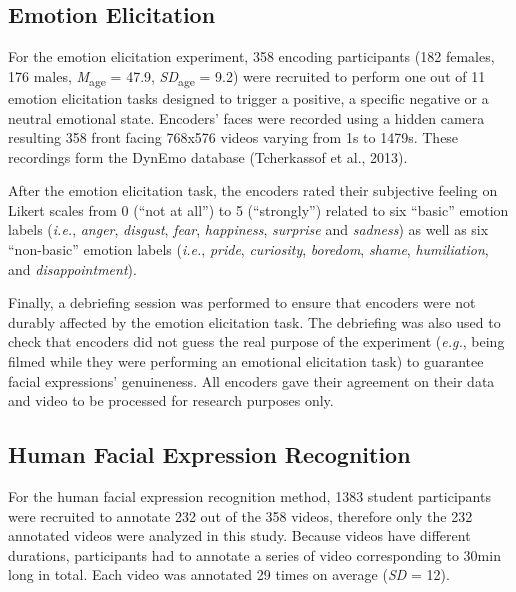 \documentclass[man]{apa6}
\begin{document}
\hypertarget{emotion-elicitation}{%
\subsection{Emotion Elicitation}\label{emotion-elicitation}}

For the emotion elicitation experiment, 358 encoding participants (182 females, 176 males, \emph{M}\textsubscript{age} = 47.9, \emph{SD}\textsubscript{age} = 9.2) were recruited to perform one out of 11 emotion elicitation tasks designed to trigger a positive, a specific negative or a neutral emotional state. Encoders' faces were recorded using a hidden camera resulting 358 front facing 768x576 videos varying from 1s to 1479s. These recordings form the DynEmo database (Tcherkassof et al., 2013).

After the emotion elicitation task, the encoders rated their subjective feeling on Likert scales from 0 (\enquote{not at all}) to 5 (\enquote{strongly}) related to six \enquote{basic} emotion labels (\emph{i.e.}, \emph{anger}, \emph{disgust}, \emph{fear}, \emph{happiness}, \emph{surprise} and \emph{sadness}) as well as six \enquote{non-basic} emotion labels (\emph{i.e.}, \emph{pride}, \emph{curiosity}, \emph{boredom}, \emph{shame}, \emph{humiliation}, and \emph{disappointment}).

Finally, a debriefing session was performed to ensure that encoders were not durably affected by the emotion elicitation task. The debriefing was also used to check that encoders did not guess the real purpose of the experiment (\emph{e.g.}, being filmed while they were performing an emotional elicitation task) to guarantee facial expressions' genuineness. All encoders gave their agreement on their data and video to be processed for research purposes only.

\hypertarget{human-facial-expression-recognition}{%
\subsection{Human Facial Expression Recognition}\label{human-facial-expression-recognition}}

For the human facial expression recognition method, 1383 student participants were recruited to annotate 232 out of the 358 videos, therefore only the 232 annotated videos were analyzed in this study. Because videos have different durations, participants had to annotate a series of video corresponding to 30min long in total. Each video was annotated 29 times on average (\emph{SD} = 12).
\end{document}
